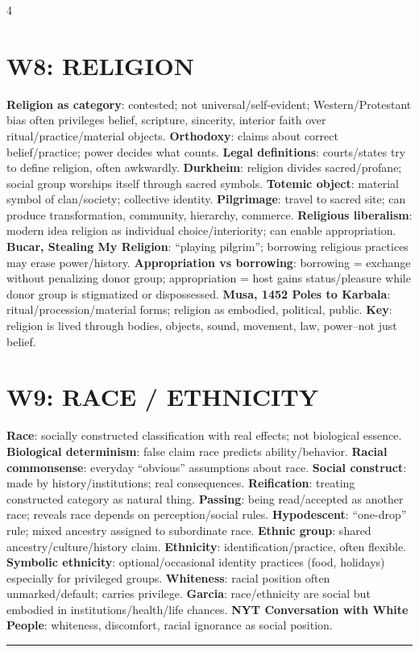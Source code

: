 \documentclass[10pt,landscape]{article}
\newcommand{\kw}[1]{\textbf{#1}}
\newcommand{\sep}{\vspace{0.8pt}\hrule\vspace{0.8pt}}
\begin{document}
\begin{multicols*}{4}
\section*{W8: RELIGION}
\kw{Religion as category}: contested; not universal/self-evident; Western/Protestant bias often privileges belief, scripture, sincerity, interior faith over ritual/practice/material objects. \kw{Orthodoxy}: claims about correct belief/practice; power decides what counts. \kw{Legal definitions}: courts/states try to define religion, often awkwardly. \kw{Durkheim}: religion divides sacred/profane; social group worships itself through sacred symbols. \kw{Totemic object}: material symbol of clan/society; collective identity. \kw{Pilgrimage}: travel to sacred site; can produce transformation, community, hierarchy, commerce. \kw{Religious liberalism}: modern idea religion as individual choice/interiority; can enable appropriation. \kw{Bucar, Stealing My Religion}: ``playing pilgrim''; borrowing religious practices may erase power/history. \kw{Appropriation vs borrowing}: borrowing = exchange without penalizing donor group; appropriation = host gains status/pleasure while donor group is stigmatized or dispossessed. \kw{Musa, 1452 Poles to Karbala}: ritual/procession/material forms; religion as embodied, political, public. \kw{Key}: religion is lived through bodies, objects, sound, movement, law, power--not just belief.

\section*{W9: RACE / ETHNICITY}
\kw{Race}: socially constructed classification with real effects; not biological essence. \kw{Biological determinism}: false claim race predicts ability/behavior. \kw{Racial commonsense}: everyday ``obvious'' assumptions about race. \kw{Social construct}: made by history/institutions; real consequences. \kw{Reification}: treating constructed category as natural thing. \kw{Passing}: being read/accepted as another race; reveals race depends on perception/social rules. \kw{Hypodescent}: ``one-drop'' rule; mixed ancestry assigned to subordinate race. \kw{Ethnic group}: shared ancestry/culture/history claim. \kw{Ethnicity}: identification/practice, often flexible. \kw{Symbolic ethnicity}: optional/occasional identity practices (food, holidays) especially for privileged groups. \kw{Whiteness}: racial position often unmarked/default; carries privilege. \kw{Garcia}: race/ethnicity are social but embodied in institutions/health/life chances. \kw{NYT Conversation with White People}: whiteness, discomfort, racial ignorance as social position.
\sep

\end{multicols*}
\end{document}
